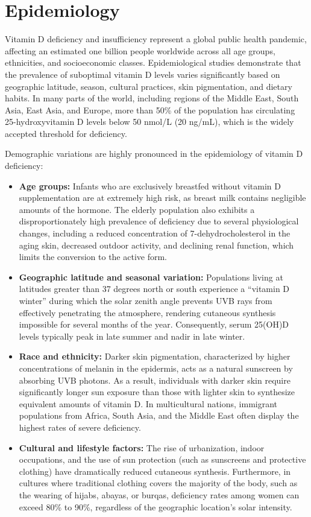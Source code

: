 \section*{Epidemiology}
Vitamin D deficiency and insufficiency represent a global public health pandemic, affecting an estimated one billion people worldwide across all age groups, ethnicities, and socioeconomic classes. Epidemiological studies demonstrate that the prevalence of suboptimal vitamin D levels varies significantly based on geographic latitude, season, cultural practices, skin pigmentation, and dietary habits. In many parts of the world, including regions of the Middle East, South Asia, East Asia, and Europe, more than 50\% of the population has circulating 25-hydroxyvitamin D levels below 50 nmol/L (20 ng/mL), which is the widely accepted threshold for deficiency.

Demographic variations are highly pronounced in the epidemiology of vitamin D deficiency:
\begin{itemize}
    \item \textbf{Age groups:} Infants who are exclusively breastfed without vitamin D supplementation are at extremely high risk, as breast milk contains negligible amounts of the hormone. The elderly population also exhibits a disproportionately high prevalence of deficiency due to several physiological changes, including a reduced concentration of 7-dehydrocholesterol in the aging skin, decreased outdoor activity, and declining renal function, which limits the conversion to the active form.
    \item \textbf{Geographic latitude and seasonal variation:} Populations living at latitudes greater than 37 degrees north or south experience a ``vitamin D winter'' during which the solar zenith angle prevents UVB rays from effectively penetrating the atmosphere, rendering cutaneous synthesis impossible for several months of the year. Consequently, serum 25(OH)D levels typically peak in late summer and nadir in late winter.
    \item \textbf{Race and ethnicity:} Darker skin pigmentation, characterized by higher concentrations of melanin in the epidermis, acts as a natural sunscreen by absorbing UVB photons. As a result, individuals with darker skin require significantly longer sun exposure than those with lighter skin to synthesize equivalent amounts of vitamin D. In multicultural nations, immigrant populations from Africa, South Asia, and the Middle East often display the highest rates of severe deficiency.
    \item \textbf{Cultural and lifestyle factors:} The rise of urbanization, indoor occupations, and the use of sun protection (such as sunscreens and protective clothing) have dramatically reduced cutaneous synthesis. Furthermore, in cultures where traditional clothing covers the majority of the body, such as the wearing of hijabs, abayas, or burqas, deficiency rates among women can exceed 80\% to 90\%, regardless of the geographic location's solar intensity.
\end{itemize}

